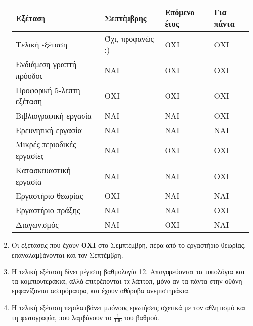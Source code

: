 \documentclass[11pt,a4paper,notitlepage,fleqn]{article}
\begin{document}
\begin{enumerate}
    \begin{center}
    \begin{tabular}{|l|l|l|l|}
    	\hline
    	\textbf{Εξέταση}           & \textbf{Σεπτέμβρης} & \textbf{Επόμενο έτος} & \textbf{Για πάντα} \\ \hline
    	Τελική εξέταση             & Όχι, προφανώς :)    & ΟΧΙ                   & ΟΧΙ                \\ \hline
    	Ενδιάμεση γραπτή πρόοδος   & ΝΑΙ                 & ΟΧΙ                   & ΟΧΙ                \\ \hline
    	Προφορική 5-λεπτη εξέταση  & ΟΧΙ                 & ΟΧΙ                   & ΟΧΙ                \\ \hline
    	Βιβλιογραφική εργασία      & ΝΑΙ                 & ΝΑΙ                   & ΟΧΙ                \\ \hline
    	Ερευνητική εργασία         & ΝΑΙ                 & ΝΑΙ                   & ΝΑΙ                \\ \hline
    	Μικρές περιοδικές εργασίες & ΝΑΙ                 & ΟΧΙ                   & ΟΧΙ                \\ \hline
    	Κατασκευαστική εργασία     & ΝΑΙ                 & ΝΑΙ                   & ΟΧΙ                \\ \hline
    	Εργαστήριο θεωρίας         & ΟΧΙ                 & ΝΑΙ                   & ΝΑΙ                \\ \hline
    	Εργαστήριο πράξης          & ΝΑΙ                 & ΝΑΙ                   & ΟΧΙ                \\ \hline
    	Διαγωνισμός                & ΝΑΙ                 & ΟΧΙ                   & ΝΑΙ                \\ \hline
    \end{tabular}%
\end{center}

    \item Οι εξετάσεις που έχουν \textbf{ΟΧΙ} στο Σεμπτέμβρη, πέρα από το εργαστήριο θεωρίας, επαναλαμβάνονται και τον Σεπτέμβρη.
    
    \item Η τελική εξέταση δίνει μέγιστη βαθμολογία 12. Απαγορεύονται τα τυπολόγια και τα κομπιουτεράκια, αλλά επιτρέπονται τα λάπτοπ, μόνο αν τα πάντα στην οθόνη εμφανίζονται ασπρόμαυρα, και έχουν αθόρυβα ανεμιστηράκια.
    
    \item Η τελική εξέταση περιλαμβάνει μπόνους ερωτήσεις σχετικά με τον αθλητισμό και τη φωτογραφία, που λαμβάνουν το \( \frac{1}{100}\) του βαθμού.
    

\end{enumerate}
\end{document}
